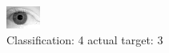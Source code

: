 \begin{figure}[h!]
\begin{center}
\includegraphics[width=0.60\columnwidth]{figures/ID2181_class_4_target_3.png}
\end{center}
\caption{ Classification: 4 actual target: 3}
\label{fig:ID2181_class_4_target_3}
\end{figure}
